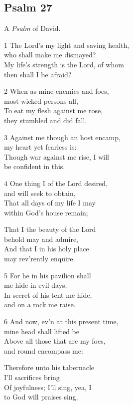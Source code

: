 \begin{multicols}{3}
\begin{center}
\quad{}\quad{}
\end{center}

\subsection*{Psalm 27 }

A \emph{Psalm} of David.

1 The Lord’s my light and saving health,\\
who shall make me dismayed?\\
My life’s strength is the Lord, of whom\\
then shall I be afraid?

2 When as mine enemies and foes,\\
most wicked persons all,\\
To eat my flesh against me rose,\\
they stumbled and did fall.

3 Against me though an host encamp,\\
my heart yet fearless is:\\
Though war against me rise, I will\\
be confident in this.

4 One thing I of the Lord desired,\\
and will seek to obtain,\\
That all days of my life I may\\
within God’s house remain;

That I the beauty of the Lord\\
behold may and admire,\\
And that I in his holy place\\
may rev’rently enquire.

5 For he in his pavilion shall\\
me hide in evil days;\\
In secret of his tent me hide,\\
and on a rock me raise.

6 And now, ev’n at this present time,\\
mine head shall lifted be\\
Above all those that are my foes,\\
and round encompass me:

Therefore unto his tabernacle\\
I’ll sacrifices bring\\
Of joyfulness; I’ll sing, yea, I\\
to God will praises sing.


\end{multicols}
